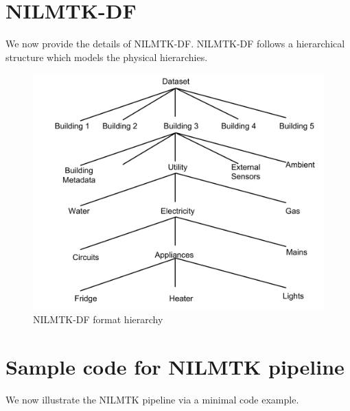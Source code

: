 \documentclass{sig-alternate}
\begin{document}


{\scriptsize
}

\newpage
\appendix
\section{NILMTK-DF}
\label{app:appendix_data_format}
We now provide the details of NILMTK-DF. NILMTK-DF follows a hierarchical structure which models the physical hierarchies. 

\begin{figure}
\centering 
\includegraphics[scale=0.5]{figures/data_format.pdf}
\caption{NILMTK-DF format hierarchy}
\label{fig:nilmtk-format}
\end{figure}

\section{Sample code for NILMTK pipeline}
\label{app:appendix_pipeline}
We now illustrate the NILMTK pipeline via a minimal code example.
\end{document}
